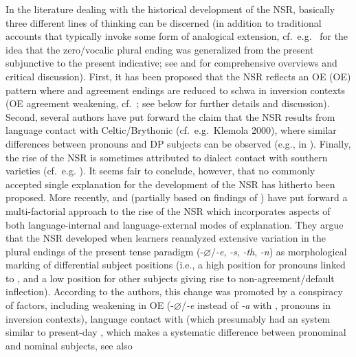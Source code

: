 \documentclass[output=paper]{langsci/langscibook}
\begin{document}
In the literature dealing with the historical development of the \gls{NSR},
basically three different lines of thinking can be discerned (in addition to
traditional accounts that typically invoke some form of analogical extension,
cf.\ e.g.\ \citealt{Sweet:1871} for the idea that the zero/vocalic plural ending
was generalized from the present subjunctive to the present indicative; see
\citealt{Pietsch:2005a,Pietsch:2005b} and \citealt{deHaas:2011} for comprehensive overviews and
critical discussion). First, it has been proposed that the \gls{NSR} reflects
an \glsdesc{OE} (\gls{OE}) pattern where \Fpl{} and \Spl{}
agreement endings are reduced to schwa in inversion contexts (\gls{OE}
agreement weakening, cf.\ \citealt{Rodeffer:1903}; see below for further details and
discussion). Second, several authors have put forward the claim that the
\gls{NSR} results from language contact with Celtic/Brythonic (cf.\ e.g.\ Klemola
2000), where similar differences between pronouns and DP subjects can be
observed (e.g., in ). Finally, the rise of the \gls{NSR} is sometimes
attributed to dialect contact with southern varieties (cf.\ e.g.
\citealt{Pietsch:2005a,Pietsch:2005b}). It seems fair to conclude, however,
that no commonly accepted single explanation for the development of the
\gls{NSR} has hitherto been proposed. More recently, \textcite{deHaas:2011} and
\textcite{deHaasandvanKemenade:2015} (partially based on findings of
\citealt{Cole2014}) have put forward a multi-factorial approach to the rise of
the \gls{NSR} which incorporates aspects of both language-internal and
language-external modes of explanation. They argue that the \gls{NSR} developed
when learners reanalyzed extensive variation in the plural endings of the
present tense paradigm (-$\varnothing$/\emph{-e}, \emph{-s}, \emph{-th}, \emph{-n}) as
morphological marking of differential subject positions (i.e., a high position
for pronouns linked to , and a low position for other subjects giving
rise to non-agreement/default inflection). According to the authors, this
change was promoted by a conspiracy of factors, including  weakening
in \gls{OE} (-$\varnothing$/\emph{-e} instead of \emph{-a\dh} with \Fpl{}, \Spl{} pronouns
in inversion contexts), language contact with  (which
presumably had an  system similar to present-day , which makes a
systematic difference between pronominal and nominal subjects, see also
\end{document}

